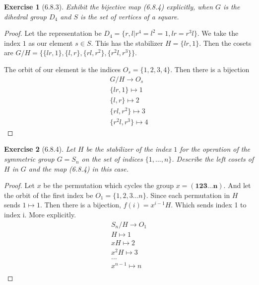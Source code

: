 \documentclass[12pt]{article}
\newtheorem*{exer}{Exercise}
\begin{document}

\begin{exer}[6.8.3]
    Exhibit the bijective map (6.8.4) explicitly, when $G$ is the
    dihedral group $D_4$ and $S$ is the set of vertices of a square.
\end{exer}

\begin{proof}
    Let the representation be  $D_4 = \{r, l | r^4 = l^2 = 1, lr =
    r^3l\}$.  We take the index $1$ as our element $s \in S$. This has
    the stabilizer $H = \{lr, 1\}$. Then the cosets are $G/H = \{\{lr,
    1\}, \{l, r\}, \{rl, r^2\}, \{r^2l, r^3\}\}$. 

    The orbit of our element is the indices $O_s = \{1, 2, 3, 4\}$. Then
    there is a bijection
    \begin{align*}
        G/H \rightarrow O_s \\
        \{lr, 1\} \mapsto 1 \\
        \{l, r\} \mapsto 2  \\
        \{rl, r^2\} \mapsto 3   \\
        \{r^2l, r^3\} \mapsto 4
    \end{align*}

\end{proof}


\begin{exer}[6.8.4]
    Let $H$ be the stabilizer of the index $1$ for the operation of the
    symmetric group $G = S_n$ on the set of indices $\{1, \dots, n\}$.
    Describe the left cosets of $H$ in $G$ and the map (6.8.4) in this
    case.
\end{exer}

\begin{proof}

    Let $x$ be the permutation which cycles the group $x = (\mathbf{123
    \dots n})$. And let the orbit of the first index be $O_1 = \{1, 2, 3
    \dots n\}$. Since each permutation in $H$ sends $1 \mapsto 1$. Then
    there is a bijection, $f(i) = x^{i-1}H$. Which sends index 1 to
    index i. More explicitly.
    \begin{align*}
        S_n / H \rightarrow O_1 \\
        H \mapsto 1 \\
        xH \mapsto 2 \\
        x^2 H \mapsto 3 \\
        \dots   \\
        x^{n-1} \mapsto n   \\
    \end{align*}
\end{proof}
\end{document}
